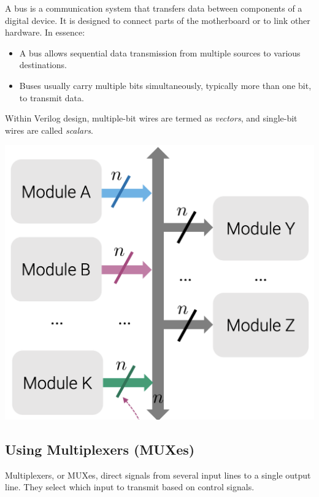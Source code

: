 \documentclass[12pt,openany, tikz,border=10pt]{book}
\begin{document}
					  \begin{minipage}{0.48\textwidth}
						  A bus is a communication system that transfers data between components of a digital device. It is designed to connect parts of the motherboard or to link other hardware. In essence:
						  \begin{itemize}
							  \item A bus allows sequential data transmission from multiple sources to various destinations.
							  \item Buses usually carry multiple bits simultaneously, typically more than one bit, to transmit data.
						  \end{itemize}
						  Within Verilog design, multiple-bit wires are termed as \textit{vectors}, and single-bit wires are called \textit{scalars}.
					  \end{minipage}
					  \hfill
					  \begin{minipage}{0.48\textwidth}
						  \centering
						  \includegraphics[width=\textwidth]{circuits/11.1.png} %
					  \end{minipage}
										  
					  \subsection{Using Multiplexers (MUXes)}
					  Multiplexers, or MUXes, direct signals from several input lines to a single output line. They select which input to transmit based on control signals.
\end{document}
